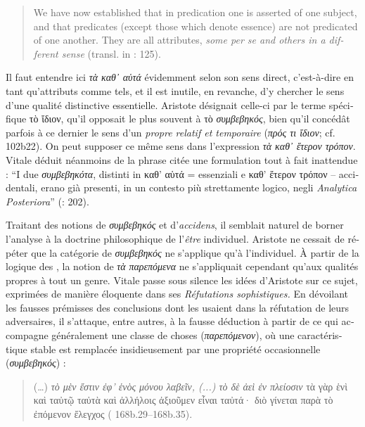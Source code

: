 \documentclass[output=paper]{langsci/langscibook}
\begin{document}
\begin{otherlanguage}{french}
\begin{quote}
    We have now established that in predication one is asserted of one subject, and that predicates (except those which denote essence) are not predicated of one another. They are all attributes, \textit{some per se and others in a different sense} (transl. in : 125).
\end{quote}

Il faut entendre ici \textit{τὰ καθ᾿ αὑτά} évidemment selon son sens direct, c’est-à-dire en tant qu’attributs comme tels, et il est inutile, en revanche, d’y chercher le sens d’une qualité distinctive essentielle. Aristote désignait celle-ci par le terme spécifique τὸ ἴδιον, qu’il opposait le plus souvent à τὸ \textit{συμβεβηκός}, bien qu’il concédât parfois à ce dernier le sens d’un \textit{propre relatif et temporaire} (\textit{πρός τι ἴδιον}; cf.  102b22). On peut supposer ce même sens dans l’expression \textit{τὰ καθ᾿ ἕτερον τρόπον}. Vitale déduit néanmoins de la phrase citée une formulation tout à fait inattendue : “I due \textit{συμβεβηκότα}, distinti in καθ’ αὑτά  = essenziali e καθ’ ἕτερον τρόπον – accidentali, erano già presenti, in un contesto più strettamente logico, negli \textit{Analytica Posteriora}” (\citealt{vitale_per_1982}: 202).

Traitant des notions de \textit{συμβεβηκός} et d’\textit{accidens}, il semblait naturel de borner l’analyse à la doctrine philosophique de l’\textit{être} individuel. Aristote ne cessait de répéter que la catégorie de \textit{συμβεβηκός} ne s’applique qu’à l’individuel. À partir de la logique des , la notion de \textit{τὰ} \textit{παρεπόμενα} ne s’appliquait cependant qu’aux qualités propres à tout un genre. Vitale passe sous silence les idées d’Aristote sur ce sujet, exprimées de manière éloquente dans ses \textit{Réfutations sophistiques.} En dévoilant les fausses prémisses des conclusions dont les  usaient dans la réfutation de leurs adversaires, il s’attaque, entre autres, à la fausse déduction à partir de ce qui accompagne généralement une classe de choses (\textit{παρεπόμενον}), où une caractéristique stable est remplacée insidieusement par une propriété occasionnelle (\textit{συμβεβηκός}) :

\begin{quote}
    
(…) \textit{τὸ μὲν  ἔστιν ἐφ’ ἑνὸς μόνου λαβεῖν, (...) τὸ δὲ  ἀεὶ ἐν πλείοσιν} τὰ γὰρ ἑνὶ καὶ ταὐτῷ ταὐτὰ καὶ ἀλλήλοις ἀξιοῦμεν εἶναι ταὐτά· διὸ γίνεται παρὰ τὸ ἐπόμενον ἔλεγχος ( 168b.29--168b.35).


\end{quote}
\end{otherlanguage}
\end{document}
